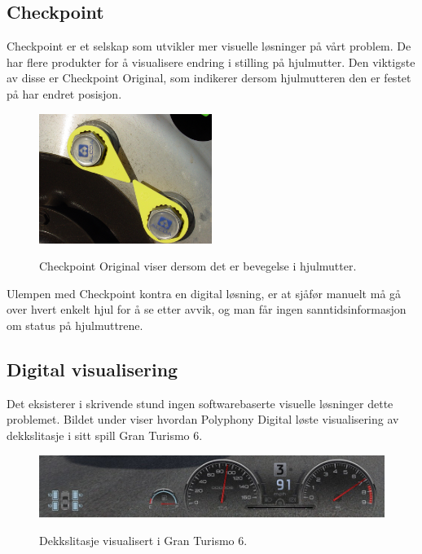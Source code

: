 \subsection{Checkpoint}
Checkpoint er et selskap som utvikler mer visuelle løsninger på vårt problem.
De har flere produkter for å visualisere endring i stilling på hjulmutter. Den 
viktigste av disse er Checkpoint Original\cite{checkpoint1}, 
som indikerer dersom hjulmutteren den er festet på har endret posisjon. 
	\newline
	\begin{figure}[H]
		\centering
		\includegraphics[width=0.50\textwidth]{images/checkpoint-original.jpg}
		\label{fig:checkpoint}
		\caption{Checkpoint Original viser dersom det er bevegelse i hjulmutter.}
	\end{figure}
Ulempen med Checkpoint kontra en digital løsning, er at sjåfør manuelt må gå over 
hvert enkelt hjul for å se etter avvik, og man får ingen sanntidsinformasjon om 
status på hjulmuttrene.

\subsection{Digital visualisering}
Det eksisterer i skrivende stund ingen softwarebaserte visuelle løsninger dette 
problemet. Bildet under viser hvordan Polyphony Digital løste visualisering av 
dekkslitasje i sitt spill Gran Turismo 6.\cite{dekkslitasje-GT6} 
	\newline
	\begin{figure}[H]
		\centering
		\includegraphics[width=1.00\textwidth]{images/gran-turismo-6-screenshot.jpg}
		\label{fig:GT6}
		\caption{Dekkslitasje visualisert i Gran Turismo 6.}
	\end{figure}
